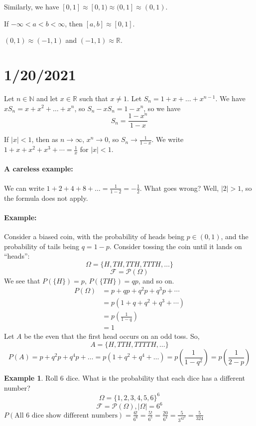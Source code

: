 \documentclass{article}
\newcommand{\R}{\mathbb{R}}
\newcommand{\N}{\mathbb{N}}
\newcommand{\p}[1]{\left(#1\right)} %
\newcommand{\pow}[1]{\mathcal{P}(#1)} %
\theoremstyle{definition}
\newtheorem*{example}{Example}
\begin{document}
Similarly, we have $[0,1] \approx [0,1) \approx (0,1] \approx (0,1)$.

If $-\infty < a < b < \infty$, then $[a,b] \approx [0,1]$.

$(0,1) \approx (-1,1)$ and $(-1,1) \approx \R$.


\section*{1/20/2021}

Let $n \in \N$ and let $x\in\R$ such that $x\neq 1$. Let $S_n = 1 + x + \dots + x^{n - 1}$. We have $xS_n = x + x^2 + \dots + x^n$, so $S_n - xS_n = 1 - x^n$, so we have
\[S_n = \frac{1 - x^n}{1 - x}\]

If $|x| < 1$, then as $n \to \infty$, $x^n \to 0$, so $S_n \to \frac{1}{1-x}$.
We write $1 + x + x^2 + x^3 + \cdots = \frac{1}{x}$ for $|x| < 1$.

\paragraph{A careless example:} We can write $1 + 2 + 4 + 8 + \dots = \frac{1}{1 - 2} = -\frac{1}{2}$. What goes wrong? Well, $|2| > 1$, so the formula does not apply. 
\paragraph{Example:} Consider a biased coin, with the probability of heads being $p\in(0,1)$, and the probability of tails being $q = 1 - p$. Consider tossing the coin until it lands on ``heads'':
\[\Omega = \{H, TH, TTH, TTTH, \dots \}\]
\[\mathscr{F}=\pow{\Omega}\]
We see that $P(\{H\}) = p$, $P(\{TH\}) = qp$, and so on. 
\begin{align*}
    P(\Omega) &= p + qp + q^2p + q^3p + \cdots \\
        &= p\p{1 + q + q^2 + q^3 + \cdots} \\
        &= p\p{\frac{1}{1-q}} \\
        &= 1
\end{align*}
Let $A$ be the even that the first head occurs on an odd toss. So, 
\[A = \{H, TTH, TTTTH, \dots\}\]
\[P(A) = p + q^2p + q^4p + \dots = p(1 + q^2 + q^4 + \dots) = p\p{\frac{1}{1 - q^2}} = p\p{\frac{1}{2 - p}} \]

\begin{example} Roll $6$ dice. What is the probability that each dice has a different number?
\[\Omega = \{1,2,3,4,5,6\}^6\]
\[\mathscr{F}=\pow\Omega, |\Omega| = 6^6\]
$P(\text{All 6 dice show different numbers}) = \frac{6!}{6^6} = \frac{5!}{6^5} = \frac{20}{6^4} = \frac{5}{3^42^2} = \frac{5}{324}$
\end{example}
\end{document}
